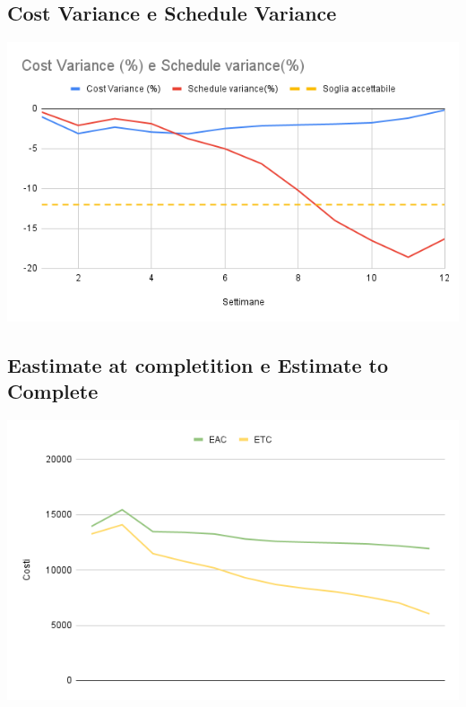 \documentclass[12pt]{article}
\begin{document}
\subsection{Cost Variance e Schedule Variance}
\begin{center}
	\includegraphics[scale=0.5]{Cost_Variance_Schedule_Variance.png}
\end{center}

\subsection{Eastimate at completition e Estimate to Complete}
\begin{center}
	\includegraphics[scale=0.6]{EAC_ETC.png}
\end{center}
\end{document}
